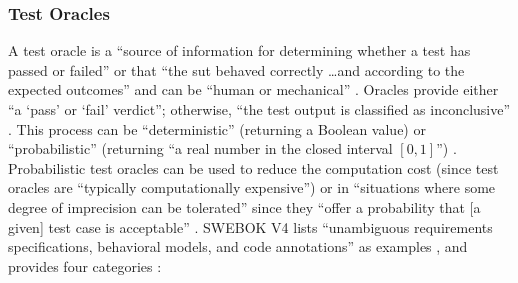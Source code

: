 \subsubsection{Test Oracles}
A test oracle is a ``source of information for determining whether a test has
passed or failed'' \citep[p.~13]{IEEE2022} or that ``the \acs{sut} behaved
correctly \dots and according to the expected outcomes'' and can be ``human or
mechanical'' \citep[p.~5-5]{SWEBOK2024}. Oracles provide either ``a
`pass' or `fail' verdict''; otherwise, ``the test output is classified as
inconclusive'' \citep[p.~5-5]{SWEBOK2024}. This process can be ``deterministic''
(returning a Boolean value) or ``probabilistic'' (returning ``a real number in
the closed interval $[0, 1]$'') \citep[p.~509]{BarrEtAl2015}. Probabilistic
test oracles can be used to reduce the computation cost (since test oracles
are ``typically computationally expensive'') \citep[p.~509]{BarrEtAl2015}
or in ``situations where some degree of imprecision can be tolerated'' since
they ``offer a probability that [a given] test case is acceptable''
\citep[p.~510]{BarrEtAl2015}. SWEBOK V4 lists ``unambiguous requirements
specifications, behavioral models, and code annotations'' as examples
\citep[p.~5-5]{SWEBOK2024}, and \citeauthor{BarrEtAl2015} provides four
categories \citeyearpar[p.~510]{BarrEtAl2015}:

